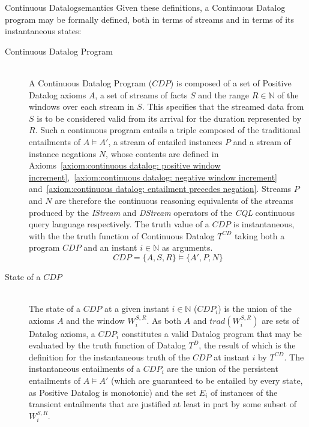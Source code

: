 \begin{nestedsection}{Continuous Datalog}{semantics}
	Given these definitions, a Continuous Datalog program may be formally defined, both in terms of streams and in terms of its instantaneous states:
	\begin{description}
		\item[Continuous Datalog Program\label{def:continuous datalog: CDP}]\hfill\\
			A Continuous Datalog Program (${CDP}$) is composed of a set of Positive Datalog axioms $A$, a set of streams of facts $S$ and the range ${R \in \mathbb{N}}$ of the windows over each stream in $S$.
			This specifies that the streamed data from $S$ is to be considered valid from its arrival for the duration represented by $R$.
			Such a continuous program entails a triple composed of the traditional entailments of ${A \vDash A'}$, a stream of entailed instances $P$ and a stream of instance negations $N$, whose contents are defined in Axioms~\ref{axiom:continuous datalog: positive window increment},~\ref{axiom:continuous datalog: negative window increment} and~\ref{axiom:continuous datalog: entailment precedes negation}.
			Streams $P$ and $N$ are therefore the continuous reasoning equivalents of the streams produced by the \emph{IStream} and \emph{DStream} operators of the \emph{CQL} continuous query language \citep{CQL} respectively.
			The truth value of a ${CDP}$ is instantaneous, with the the truth function of Continuous Datalog $T^{CD}$ taking both a program ${CDP}$ and an instant ${i \in \mathbb{N}}$ as arguments.
			\begin{equation*}
				CDP = \{A,S,R\} \vDash \{A',P,N\}
			\end{equation*}
		\item[State of a ${CDP}$\label{def:continuous datalog: CDPt}]\hfill\\
			The state of a ${CDP}$ at a given instant ${i \in \mathbb{N}}$ (${CDP_{i}}$) is the union of the axioms $A$ and the window $W^{S,R}_{i}$.
			As both $A$ and ${trad\left( W^{S,R}_{i} \right)}$ are sets of Datalog axioms, a ${CDP_{i}}$ constitutes a valid Datalog program that may be evaluated by the truth function of Datalog $T^{D}$, the result of which is the definition for the instantaneous truth of the ${CDP}$ at instant $i$ by $T^{CD}$.
			The instantaneous entailments of a $CDP_{i}$ are the union of the persistent entailments of ${A \vDash A'}$ (which are guaranteed to be entailed by every state, as Positive Datalog is monotonic) and the set $E_{i}$ of instances of the transient entailments that are justified at least in part by some subset of $W^{S,R}_{i}$. 
			\begin{equation*}

\end{equation*}
\end{description}
\end{nestedsection}
